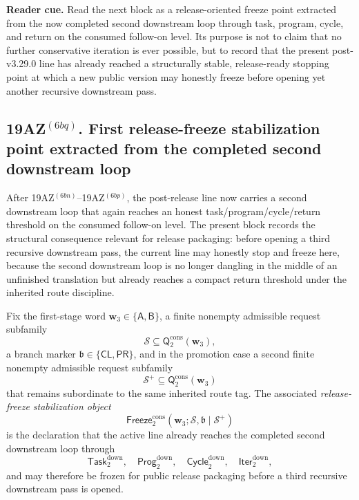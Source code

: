 \noindent\textbf{Reader cue.} Read the next block as a release-oriented freeze point extracted from the now completed second downstream loop through task, program, cycle, and return on the consumed follow-on level. Its purpose is not to claim that no further conservative iteration is ever possible, but to record that the present post-v3.29.0 line has already reached a structurally stable, release-ready stopping point at which a new public version may honestly freeze before opening yet another recursive downstream pass.

\subsection*{19AZ$^{(6bq)}$. First release-freeze stabilization point extracted from the completed second downstream loop}
\label{sec:first-release-freeze-stabilization-point-extracted-from-the-completed-second-downstream-loop}
After 19AZ$^{(6bn)}$--19AZ$^{(6bp)}$, the post-release line now carries a second downstream loop that again reaches an honest task/program/cycle/return threshold on the consumed follow-on level. The present block records the structural consequence relevant for release packaging: before opening a third recursive downstream pass, the current line may honestly stop and freeze here, because the second downstream loop is no longer dangling in the middle of an unfinished translation but already reaches a compact return threshold under the inherited route discipline.

\begin{definition}
\label{def:release-freeze-stabilization-object-for-the-completed-second-downstream-loop}
Fix the first-stage word \(\mathbf w_3\in\{\mathsf A,\mathsf B\}\), a finite nonempty admissible request subfamily
\[
  \mathcal S\subseteq \mathsf{Q}^{\mathrm{cons}}_{2}(\mathbf w_3),
\]
a branch marker \(\mathfrak b\in\{\mathsf{CL},\mathsf{PR}\}\), and in the promotion case a second finite nonempty admissible request subfamily
\[
  \mathcal S^{+}\subseteq \mathsf{Q}^{\mathrm{cons}}_{2}(\mathbf w_3)
\]
that remains subordinate to the same inherited route tag. The associated \emph{release-freeze stabilization object}
\[
  \mathsf{Freeze}^{\mathrm{cons}}_{2}(\mathbf w_3;\mathcal S,\mathfrak b\mid\mathcal S^{+})
\]
is the declaration that the active line already reaches the completed second downstream loop through
\[
  \mathsf{Task}^{\mathrm{down}}_{2},
  \quad
  \mathsf{Prog}^{\mathrm{down}}_{2},
  \quad
  \mathsf{Cycle}^{\mathrm{down}}_{2},
  \quad
  \mathsf{Iter}^{\mathrm{down}}_{2},
\]
and may therefore be frozen for public release packaging before a third recursive downstream pass is opened.
\end{definition}


